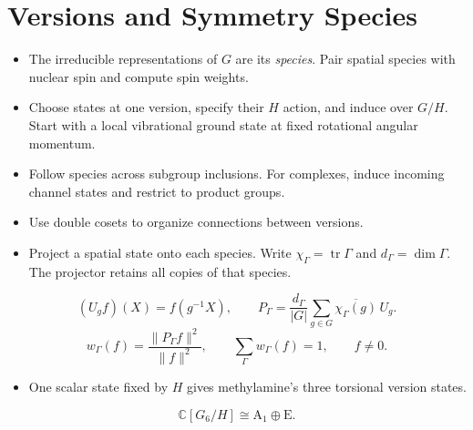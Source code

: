 \documentclass[12pt]{article}
\begin{document}
\section{Versions and Symmetry Species}
\begin{itemize}
\item The irreducible representations of $G$ are its \emph{species}.
Pair spatial species with nuclear spin and compute spin weights.
\item Choose states at one version, specify their $H$ action, and induce
over $G/H$. Start with a local vibrational ground state at fixed
rotational angular momentum.
\item Follow species across subgroup inclusions. For complexes,
induce incoming channel states and restrict to product groups.
\item Use double cosets to organize connections between versions.
\item Project a spatial state onto each species. Write
$\chi_\Gamma=\operatorname{tr}\Gamma$ and $d_\Gamma=\dim\Gamma$.
The projector retains all copies of that species.
\end{itemize}
\[
(U_gf)(X)=f(g^{-1}X),\qquad
P_\Gamma=\frac{d_\Gamma}{|G|}
\sum_{g\in G}\overline{\chi_\Gamma(g)}\,U_g.
\]
\[
w_\Gamma(f)=\frac{\|P_\Gamma f\|^2}{\|f\|^2},
\qquad \sum_\Gamma w_\Gamma(f)=1,\qquad f\ne0.
\]
\begin{itemize}
\item One scalar state fixed by $H$ gives methylamine's three torsional
version states.
\end{itemize}
\[
\mathbb C[G_6/H]\cong\mathrm A_1\oplus\mathrm E.
\]

\end{document}
